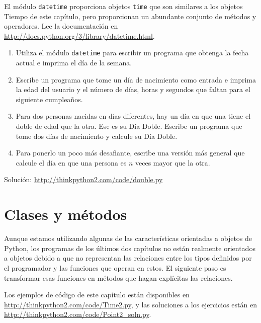 \documentclass[10pt]{book}
\begin{document}
\begin{exercise}

El módulo {\tt datetime} proporciona objetos {\tt time}
que son similares a los objetos Tiempo de este capítulo, pero
proporcionan un abundante conjunto de métodos y operadores.  Lee la
documentación en \url{http://docs.python.org/3/library/datetime.html}.

\begin{enumerate}

\item Utiliza el módulo {\tt datetime} para escribir un programa que obtenga la
  fecha actual e imprima el día de la semana.

\item Escribe un programa que tome un día de nacimiento como entrada e imprima la
  edad del usuario y el número de días, horas y segundos que faltan para
  el siguiente cumpleaños.

\item Para dos personas nacidas en días diferentes, hay un día en que una
  tiene el doble de edad que la otra.  Ese es su Día Doble.  Escribe un
  programa que tome dos días de nacimiento y calcule su Día Doble.

\item Para ponerlo un poco más desafiante, escribe una versión más general que
  calcule el día en que una persona es $n$ veces mayor que la otra.

\end{enumerate}

Solución: \url{http://thinkpython2.com/code/double.py}

\end{exercise}


\chapter{Clases y métodos}

Aunque estamos utilizando algunas de las características orientadas a objetos de Python,
los programas de los últimos dos capítulos no están realmente
orientados a objetos debido a que no representan las relaciones
entre los tipos definidos por el programador y las funciones que operan
en estos.  El siguiente paso es transformar esas funciones en
métodos que hagan explícitas las relaciones.

Los ejemplos de código de este capítulo están disponibles en
\url{http://thinkpython2.com/code/Time2.py}, y las soluciones
a los ejercicios están en \url{http://thinkpython2.com/code/Point2_soln.py}.
\end{document}
